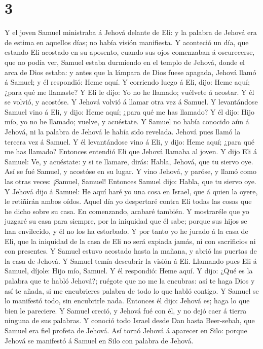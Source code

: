 \hypertarget{section-2}{%
\section{3}\label{section-2}}

 Y el joven Samuel ministraba á Jehová delante de Eli: y
la palabra de Jehová era de estima en aquellos días; no había visión
manifiesta.  Y aconteció un día, que estando Eli acostado
en su aposento, cuando sus ojos comenzaban á oscurecerse, que no podía
ver,  Samuel estaba durmiendo en el templo de Jehová,
donde el arca de Dios estaba: y antes que la lámpara de Dios fuese
apagada,  Jehová llamó á Samuel; y él respondió: Heme
aquí.  Y corriendo luego á Eli, dijo: Heme aquí; ¿para qué
me llamaste? Y Eli le dijo: Yo no he llamado; vuélvete á acostar. Y él
se volvió, y acostóse.  Y Jehová volvió á llamar otra vez
á Samuel. Y levantándose Samuel vino á Eli, y dijo: Heme aquí; ¿para qué
me has llamado? Y él dijo: Hijo mío, yo no he llamado; vuelve, y
acuéstate.  Y Samuel no había conocido aún á Jehová, ni la
palabra de Jehová le había sido revelada.  Jehová pues
llamó la tercera vez á Samuel. Y él levantándose vino á Eli, y dijo:
Heme aquí; ¿para qué me has llamado? Entonces entendió Eli que Jehová
llamaba al joven.  Y dijo Eli á Samuel: Ve, y acuéstate: y
si te llamare, dirás: Habla, Jehová, que tu siervo oye. Así se fué
Samuel, y acostóse en su lugar.  Y vino Jehová, y paróse,
y llamó como las otras veces: ¡Samuel, Samuel! Entonces Samuel dijo:
Habla, que tu siervo oye.  Y Jehová dijo á Samuel: He
aquí haré yo una cosa en Israel, que á quien la oyere, le retiñirán
ambos oídos.  Aquel día yo despertaré contra Eli todas
las cosas que he dicho sobre su casa. En comenzando, acabaré también.
 Y mostraréle que yo juzgaré su casa para siempre, por la
iniquidad que él sabe; porque sus hijos se han envilecido, y él no los
ha estorbado.  Y por tanto yo he jurado á la casa de Eli,
que la iniquidad de la casa de Eli no será expiada jamás, ni con
sacrificios ni con presentes.  Y Samuel estuvo acostado
hasta la mañana, y abrió las puertas de la casa de Jehová. Y Samuel
temía descubrir la visión á Eli.  Llamando pues Eli á
Samuel, díjole: Hijo mío, Samuel. Y él respondió: Heme aquí.
 Y dijo: ¿Qué es la palabra que te habló Jehová?; ruégote
que no me la encubras: así te haga Dios y así te añada, si me
encubrieres palabra de todo lo que habló contigo.  Y
Samuel se lo manifestó todo, sin encubrirle nada. Entonces él dijo:
Jehová es; haga lo que bien le pareciere.  Y Samuel
creció, y Jehová fué con él, y no dejó caer á tierra ninguna de sus
palabras.  Y conoció todo Israel desde Dan hasta
Beer-sebah, que Samuel era fiel profeta de Jehová.  Así
tornó Jehová á aparecer en Silo: porque Jehová se manifestó á Samuel en
Silo con palabra de Jehová.

